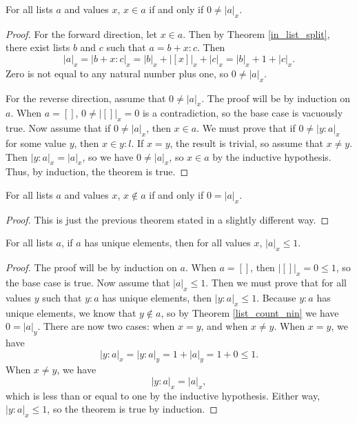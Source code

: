 \documentclass[../math.tex]{subfiles}
\begin{document}
\begin{theorem} \label{list_count_in}
    For all lists $a$ and values $x$, $x \in a$ if and only if $0 \neq |a|_x$.
\end{theorem}
\begin{proof}
    For the forward direction, let $x \in a$.  Then by Theorem
    \ref{in_list_split}, there exist lists $b$ and $c$ such that $a = b + x :
    c$.  Then
    \[
        |a|_x = |b + x : c|_x = |b|_x + |[x]|_x + |c|_x = |b|_x + 1 + |c|_x.
    \]
    Zero is not equal to any natural number plus one, so $0 \neq |a|_x$.

    For the reverse direction, assume that $0 \neq |a|_x$.  The proof will be by
    induction on $a$.  When $a = []$, $0 \neq |[]|_x = 0$ is a contradiction, so
    the base case is vacuously true.  Now assume that if $0 \neq |a|_x$, then $x
    \in a$.  We must prove that if $0 \neq |y : a|_x$ for some value $y$, then
    $x \in y : l$.  If $x = y$, the result is trivial, so assume that $x \neq
    y$.  Then $|y : a|_x = |a|_x$, so we have $0 \neq |a|_x$, so $x \in a$ by
    the inductive hypothesis.  Thus, by induction, the theorem is true.
\end{proof}

\begin{theorem} \label{list_count_nin}
    For all lists $a$ and values $x$, $x \notin a$ if and only if $0 = |a|_x$.
\end{theorem}
\begin{proof}
    This is just the previous theorem stated in a slightly different way.
\end{proof}

\begin{theorem} \label{list_count_unique}
    For all lists $a$, if $a$ has unique elements, then for all values $x$,
    $|a|_x \leq 1$.
\end{theorem}
\begin{proof}
    The proof will be by induction on $a$.  When $a = []$, then $|[]|_x = 0 \leq
    1$, so the base case is true.  Now assume that $|a|_x \leq 1$.  Then we must
    prove that for all values $y$ such that $y : a$ has unique elements, then
    $|y : a|_x \leq 1$.  Because $y : a$ has unique elements, we know that $y
    \notin a$, so by Theorem \ref{list_count_nin} we have $0 = |a|_y$.  There
    are now two cases: when $x = y$, and when $x \neq y$.  When $x = y$, we have
    \[
        |y : a|_x = |y : a|_y = 1 + |a|_y = 1 + 0 \leq 1.
    \]
    When $x \neq y$, we have
    \[
        |y : a|_x = |a|_x,
    \]
    which is less than or equal to one by the inductive hypothesis.  Either way,
    $|y : a|_x \leq 1$, so the theorem is true by induction.
\end{proof}
\end{document}
